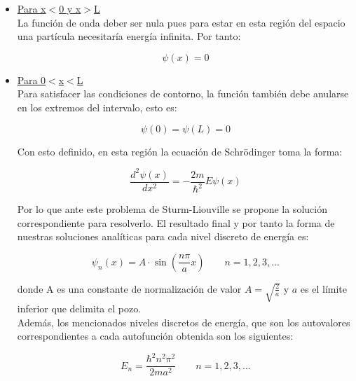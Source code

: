 \documentclass[12pt]{article}
\begin{document}
    \begin{itemize}
        \item \underline{Para x$<$0 y x$>$L}\\
        La función de onda deber ser nula pues para estar en esta región del espacio una partícula necesitaría energía infinita. Por tanto:

        \begin{equation*}
            \psi (x) = 0
        \end{equation*}

        \item \underline{Para 0$<$x$<$L}\\
        Para satisfacer las condiciones de contorno, la función también debe anularse en los extremos del intervalo, esto es:
        
        \begin{equation*}
            \psi (0) = \psi (L) = 0
        \end{equation*}
    
    Con esto definido, en esta región la ecuación de Schrödinger toma la forma: 

    \begin{equation*}
    \frac{d^{2}\psi(x)}{d x^{2}} = -\frac{2m}{\hbar^2} E \psi(x)
    \end{equation*}

    Por lo que ante este problema de Sturm-Liouville se propone la solución correspondiente para resolverlo. El resultado final y por tanto la forma de nuestras soluciones analíticas para cada nivel discreto de energía es:

\begin{equation*}
    \boxed{\psi_n (x) = A\cdot\sin{\left(\frac{n\pi}{a}x\right)}\,\,\,\,\,\,\,\,\,\,\,\, n=1,2,3,...}
\end{equation*}

    donde A es una constante de normalización de valor $A=\sqrt{\frac{2}{a}}$ y $a$ es el límite inferior que delimita el pozo.\\

    Además, los mencionados niveles discretos de energía, que son los autovalores correspondientes a cada autofunción obtenida son los siguientes:

    \begin{equation*}
    \boxed{E_n = \frac{\hbar^2n^2\pi^2}{2ma^2}\,\,\,\,\,\,\,\,\,\,\,\, n=1,2,3,...}
    \end{equation*}

    \end{itemize}
\end{document}
